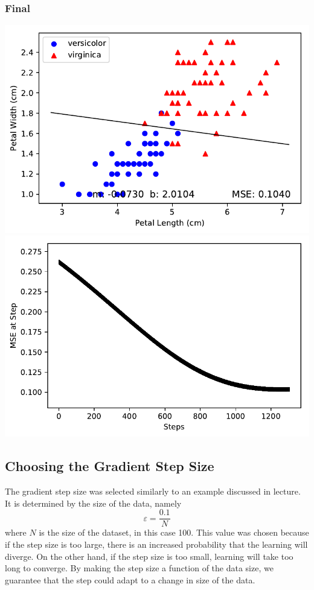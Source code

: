 \documentclass[letterpaper]{article}
\begin{document}
\subsubsection{Final}
\begin{center}
\includegraphics{plot_3c_5.pdf}
\includegraphics{plot_3c_6.pdf}
\end{center}

\subsection{Choosing the Gradient Step Size}

The gradient step size was selected similarly to an example discussed in
lecture. It is determined by the size of the data, namely
\begin{equation*}
\varepsilon = \frac{0.1}{N}
\end{equation*}
where $N$ is the size of the dataset, in this case 100.
This value was chosen because if the step size is too large, there is an
increased probability that the learning will diverge. On the other hand,
if the step size is too small, learning will take too long to converge.
By making the step size a function of the data size, we guarantee that the
step could adapt to a change in size of the data.
\end{document}
